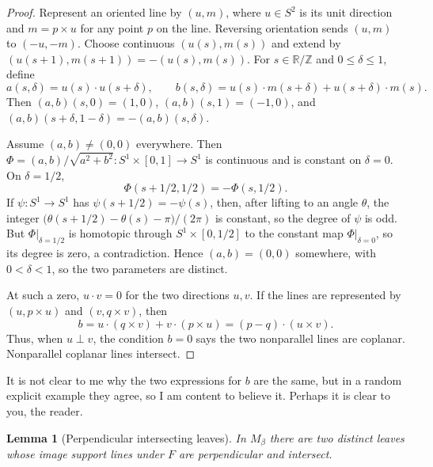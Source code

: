 \documentclass[12pt]{article}
\newcommand{\R}{\mathbb R}
\newcommand{\Z}{\mathbb Z}
\theoremstyle{plain}
\newtheorem{lemma}[theorem]{Lemma}
\newcommand{\review}[1]{\begin{reviewbox}#1\end{reviewbox}}
\begin{document}
\begin{proof}
Represent an oriented line by \((u,m)\), where \(u\in S^2\) is its unit
direction and \(m=p\times u\) for any point \(p\) on the line.  Reversing
orientation sends \((u,m)\) to \((-u,-m)\).  Choose continuous
\((u(s),m(s))\) and extend by \((u(s+1),m(s+1))=-(u(s),m(s))\).  For
\(s\in\R/\Z\) and \(0\le\delta\le1\), define
\[
a(s,\delta)=u(s)\cdot u(s+\delta),\qquad
b(s,\delta)=u(s)\cdot m(s+\delta)+u(s+\delta)\cdot m(s).
\]
Then \((a,b)(s,0)=(1,0)\), \((a,b)(s,1)=(-1,0)\), and
\((a,b)(s+\delta,1-\delta)=-(a,b)(s,\delta)\).

Assume \((a,b)\ne(0,0)\) everywhere.  Then
\(\Phi=(a,b)/\sqrt{a^2+b^2}:S^1\times[0,1]\to S^1\) is continuous and is
constant on \(\delta=0\).  On \(\delta=1/2\),
\[
\Phi(s+1/2,1/2)=-\Phi(s,1/2).
\]
If \(\psi:S^1\to S^1\) has \(\psi(s+1/2)=-\psi(s)\), then, after lifting to an
angle \(\theta\), the integer
\(\bigl(\theta(s+1/2)-\theta(s)-\pi\bigr)/(2\pi)\) is constant, so the degree
of \(\psi\) is odd.  But \(\Phi|_{\delta=1/2}\) is homotopic through
\(S^1\times[0,1/2]\) to the constant map \(\Phi|_{\delta=0}\), so its degree is
zero, a contradiction.  Hence \((a,b)=(0,0)\) somewhere, with
\(0<\delta<1\), so the two parameters are distinct.

At such a zero, \(u\cdot v=0\) for the two directions \(u,v\).  If the lines
are represented by \((u,p\times u)\) and \((v,q\times v)\), then
\[
b=u\cdot(q\times v)+v\cdot(p\times u)=(p-q)\cdot(u\times v).
\]
Thus, when \(u\perp v\), the condition \(b=0\) says the two nonparallel lines
are coplanar.  Nonparallel coplanar lines intersect.
\end{proof}

\review{It is not clear to me why the two expressions for $b$ are the same, but in a random explicit example they agree, so I am content to believe it. Perhaps it is clear to you, the reader.}

\begin{lemma}[Perpendicular intersecting leaves]\label{lem:perpleaves}
In \(M_\beta\) there are two distinct leaves whose image support lines under
\(F\) are perpendicular and intersect.
\end{lemma}
\end{document}
